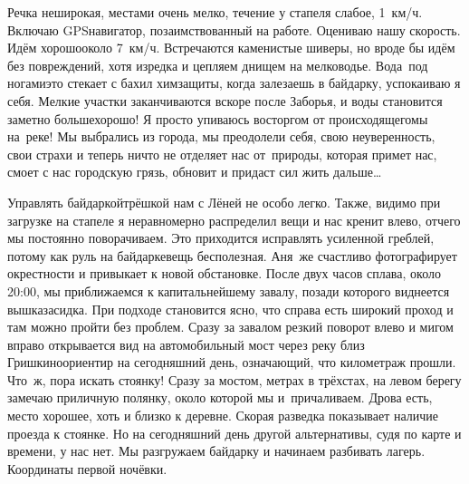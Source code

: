 Речка неширокая, местами очень мелко, течение у стапеля слабое, 1~км/ч. Включаю GPS\sdash навигатор, позаимствованный на работе. Оцениваю нашу скорость. Идём хорошо\mdash около 7~км/ч. Встречаются каменистые шиверы, но вроде бы идём без повреждений, хотя изредка и цепляем днищем на мелководье. Вода~под ногами\mdash это стекает с бахил химзащиты, когда залезаешь в байдарку, успокаиваю я себя. Мелкие участки заканчиваются вскоре после Заборья, и воды становится заметно больше\mdash хорошо! Я просто упиваюсь восторгом от происходящего\mdash мы на~реке! Мы выбрались из города, мы преодолели себя, свою неуверенность, свои страхи и теперь ничто не отделяет нас от~природы, которая примет нас, смоет с нас городскую грязь, обновит и придаст сил жить дальше\ldots~

Управлять байдаркой\sdash трёшкой нам с Лёней не особо легко. Также, видимо при загрузке на стапеле я неравномерно распределил вещи и нас кренит влево, отчего мы постоянно поворачиваем. Это приходится исправлять усиленной греблей, потому как руль на байдарке\mdash вещь бесполезная. Аня~же счастливо фотографирует окрестности и привыкает к новой обстановке. После двух часов сплава, около 20:00, мы приближаемся к капитальнейшему завалу, позади которого виднеется вышка\sdash засидка. При подходе становится ясно, что справа есть широкий проход и там можно пройти  без проблем. Сразу за завалом резкий поворот влево и мигом вправо открывается вид на автомобильный мост через реку близ Гришкино\mdash ориентир на сегодняшний день, означающий, что километраж прошли. Что~ж, пора искать стоянку! Сразу за мостом, метрах в трёхстах, на левом берегу замечаю приличную полянку, около которой мы и~причаливаем. Дрова есть, место хорошее, хоть и близко к деревне. Скорая разведка показывает наличие проезда к стоянке. Но на сегодняшний день другой альтернативы, судя по карте и времени, у нас нет. Мы разгружаем байдарку и начинаем разбивать лагерь. Координаты первой ночёвки. 

